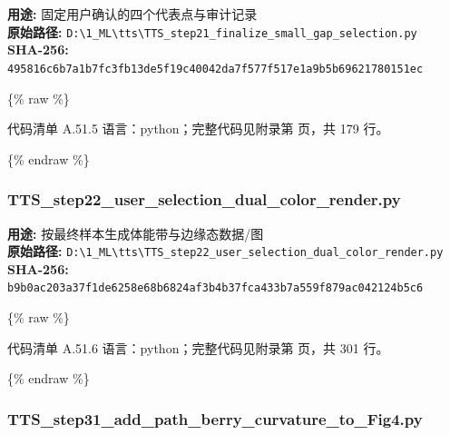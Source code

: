 \documentclass[lang=cn,scheme=chinese,color=blue,device=normal,toc=onecol,math=cm]{elegantbook}
\begin{document}
\textbf{用途:} 固定用户确认的四个代表点与审计记录\\ \textbf{原始路径:} \texttt{D:\textbackslash{}\allowbreak{}1\_\allowbreak{}ML\textbackslash{}\allowbreak{}tts\textbackslash{}\allowbreak{}TTS\_\allowbreak{}step21\_\allowbreak{}finalize\_\allowbreak{}small\_\allowbreak{}gap\_\allowbreak{}selection.py}\\ \textbf{SHA-256:} \texttt{495816c6b7a1b7fc3fb13de5f19c40042da7f577f517e1a9b5b69621780151ec}\par


\{\% raw \%\}\par


\begin{codeindexbox}{代码清单 A.51.5}
语言：python；完整代码见附录第 \pageref{code:51:5} 页，共 179 行。
\end{codeindexbox}


\{\% endraw \%\}\par


\subsubsection{TTS\_\allowbreak{}step22\_\allowbreak{}user\_\allowbreak{}selection\_\allowbreak{}dual\_\allowbreak{}color\_\allowbreak{}render.py}


\textbf{用途:} 按最终样本生成体能带与边缘态数据/\allowbreak{}图\\ \textbf{原始路径:} \texttt{D:\textbackslash{}\allowbreak{}1\_\allowbreak{}ML\textbackslash{}\allowbreak{}tts\textbackslash{}\allowbreak{}TTS\_\allowbreak{}step22\_\allowbreak{}user\_\allowbreak{}selection\_\allowbreak{}dual\_\allowbreak{}color\_\allowbreak{}render.py}\\ \textbf{SHA-256:} \texttt{b9b0ac203a37f1de6258e68b6824af3b4b37fca433b7a559f879ac042124b5c6}\par


\{\% raw \%\}\par


\begin{codeindexbox}{代码清单 A.51.6}
语言：python；完整代码见附录第 \pageref{code:51:6} 页，共 301 行。
\end{codeindexbox}


\{\% endraw \%\}\par


\subsubsection{TTS\_\allowbreak{}step31\_\allowbreak{}add\_\allowbreak{}path\_\allowbreak{}berry\_\allowbreak{}curvature\_\allowbreak{}to\_\allowbreak{}Fig4.py}
\end{document}
